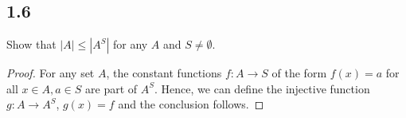 \subsection*{1.6} Show that $|A| \leq |A^S|$ for any $A$ and $S \neq \emptyset$.

\begin{proof}
For any set $A$, the constant functions $f:A \rightarrow S$ of the form $f(x) = a$ for all $x \in A, a \in S$ are part of $A^S$. Hence, we can define the injective function $g:A \rightarrow A^S$, $g(x) = f$ and the conclusion follows.
\end{proof}

